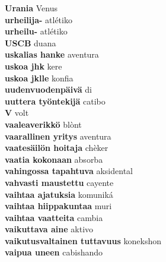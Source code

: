 \textbf{ Urania  } Venus \\
\textbf{ urheilija-  } atlétiko \\
\textbf{ urheilu-  } atlétiko \\
\textbf{ USCB  } duana \\
\textbf{ uskalias hanke  } aventura \\
\textbf{ uskoa jhk  } kere \\
\textbf{ uskoa jklle  } konfia \\
\textbf{ uudenvuodenpäivä  } di \\
\textbf{ uuttera työntekijä  } catibo \\
\textbf{ V  } volt \\
\textbf{ vaaleaverikkö  } blònt \\
\textbf{ vaarallinen yritys  } aventura \\
\textbf{ vaatesäilön hoitaja  } chèker \\
\textbf{ vaatia kokonaan  } absorba \\
\textbf{ vahingossa tapahtuva  } aksidental \\
\textbf{ vahvasti maustettu  } cayente \\
\textbf{ vaihtaa ajatuksia  } komuniká \\
\textbf{ vaihtaa hiippakuntaa  } muri \\
\textbf{ vaihtaa vaatteita  } cambia \\
\textbf{ vaikuttava aine  } aktivo \\
\textbf{ vaikutusvaltainen tuttavuus  } konekshon \\
\textbf{ vaipua uneen  } cabishando \\
